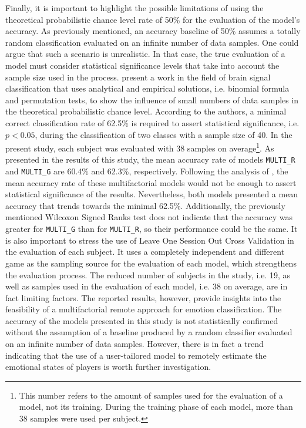 Finally, it is important to highlight the possible limitations of using the theoretical probabilistic chance level rate of 50\% for the evaluation of the model's accuracy. As previously mentioned, an accuracy baseline of 50\% assumes a totally random classification evaluated on an infinite number of data samples. One could argue that such a scenario is unrealistic. In that case, the true evaluation of a model must consider statistical significance levels that take into account the sample size used in the process. \textcite{combrisson2015exceeding} present a work in the field of brain signal classification that uses analytical and empirical solutions, i.e. binomial formula and permutation tests, to show the influence of small numbers of data samples in the theoretical probabilistic chance level. According to the authors, a minimal correct classification rate of 62.5\% is required to assert statistical significance, i.e. $p < 0.05$, during the classification of two classes with a sample size of 40. In the present study, each subject was evaluated with 38 samples on average\footnote{This number refers to the amount of samples used for the evaluation of a model, not its training. During the training phase of each model, more than 38 samples were used per subject.}. As presented in the results of this study, the mean accuracy rate of models \texttt{MULTI\_R} and \texttt{MULTI\_G} are 60.4\% and 62.3\%, respectively. Following the analysis of \textcite{combrisson2015exceeding}, the mean accuracy rate of these multifactorial models would not be enough to assert statistical significance of the results. Nevertheless, both models presented a mean accuracy that trends towards the minimal 62.5\%. Additionally, the previously mentioned Wilcoxon Signed Ranks test does not indicate that the accuracy was greater for \texttt{MULTI\_G} than for \texttt{MULTI\_R}, so their performance could be the same. It is also important to stress the use of Leave One Session Out Cross Validation in the evaluation of each subject. It uses a completely independent and different game as the sampling source for the evaluation of each model, which strengthens the evaluation process. The reduced number of subjects in the study, i.e. 19, as well as samples used in the evaluation of each model, i.e. 38 on average, are in fact limiting factors. The reported results, however, provide insights into the feasibility of a multifactorial remote approach for emotion classification. The accuracy of the models presented in this study is not statistically confirmed without the assumption of a baseline produced by a random classifier evaluated on an infinite number of data samples. However, there is in fact a trend indicating that the use of a user-tailored model to remotely estimate the emotional states of players is worth further investigation.


